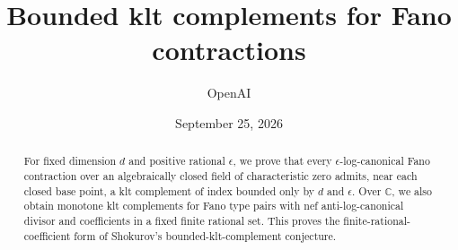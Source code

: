 \documentclass[11pt]{amsart}
\title[Bounded klt complements]{Bounded klt complements for Fano contractions}
\author{OpenAI}
\date{September 25, 2026}
\begin{document}
\begin{abstract}
For fixed dimension $d$ and positive rational $\epsilon$, we prove that
every $\epsilon$-log-canonical Fano contraction over an algebraically
closed field of characteristic zero admits, near each closed base point,
a klt complement of index bounded only by $d$ and $\epsilon$.
Over $\mathbb C$, we also obtain monotone klt complements for Fano type
pairs with nef anti-log-canonical divisor and coefficients in a fixed
finite rational set. This proves the finite-rational-coefficient form of
Shokurov's bounded-klt-complement conjecture.
\end{abstract}
\maketitle
\enlargethispage{2pt}
\tableofcontents
















\end{document}
